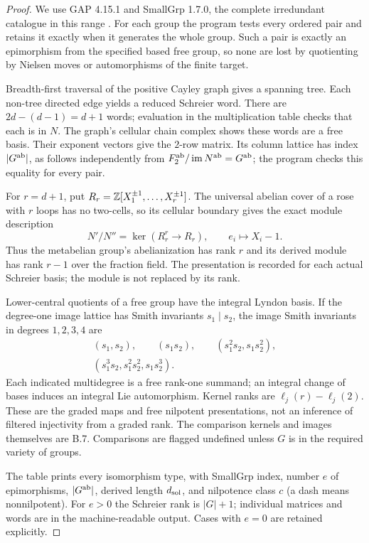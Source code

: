 \begin{proof}
We use GAP 4.15.1 and SmallGrp 1.7.0, the complete
irredundant catalogue in this range \citep{SmallGrp2025}.
For each group the program tests every ordered pair and
retains it exactly when it generates the whole group.
Such a pair is exactly an epimorphism from the specified
based free group, so none are lost by quotienting by
Nielsen moves or automorphisms of the finite target.

Breadth-first traversal of the positive Cayley graph gives a
spanning tree. Each non-tree directed edge yields a reduced
Schreier word. There are $2d-(d-1)=d+1$ words; evaluation in
the multiplication table checks that each is in $N$.
The graph's cellular chain complex shows these words are a
free basis. Their exponent vectors give the $2$-row matrix.
Its column lattice has index $|G^{\mathrm{ab}}|$, as follows
independently from $F_2^{\mathrm{ab}}/\operatorname{im} N^{\mathrm{ab}}=G^{\mathrm{ab}}$;
the program checks this equality for every pair.

For $r=d+1$, put $R_r=\mathbb Z[X_1^{\pm1},\ldots,X_r^{\pm1}]$.
The universal abelian cover of a rose with $r$ loops has no
two-cells, so its cellular boundary gives the exact module
description
\[
 N'/N''=\ker(R_r^r\longrightarrow R_r),
 \qquad e_i\longmapsto X_i-1.
\]
Thus the metabelian group's abelianization has rank $r$
and its derived module has rank $r-1$ over the fraction field.
The presentation is recorded for each actual Schreier basis;
the module is not replaced by its rank.

Lower-central quotients of a free group have the integral
Lyndon basis. If the degree-one image lattice has Smith
invariants $s_1\mid s_2$, the image Smith invariants in
degrees $1,2,3,4$ are
\[
\begin{gathered}
 (s_1,s_2),\qquad(s_1s_2),\qquad
 (s_1^2s_2,s_1s_2^2),\\
 (s_1^3s_2,s_1^2s_2^2,s_1s_2^3).
\end{gathered}
\]
Each indicated multidegree is a free rank-one summand;
an integral change of bases induces an integral Lie
automorphism. Kernel ranks are $\ell_j(r)-\ell_j(2)$.
These are the graded maps and free nilpotent presentations,
not an inference of filtered injectivity from a graded rank.
The comparison kernels and images themselves are B.7.
Comparisons are flagged undefined unless $G$ is in the
required variety of groups.

The table prints every isomorphism type, with SmallGrp
index, number $e$ of epimorphisms, $|G^{\mathrm{ab}}|$, derived
length $d_{\rm sol}$, and nilpotence class $c$ (a dash means
nonnilpotent). For $e>0$ the Schreier rank is $|G|+1$;
individual matrices and words are in the machine-readable
output. Cases with $e=0$ are retained explicitly.
\end{proof}


